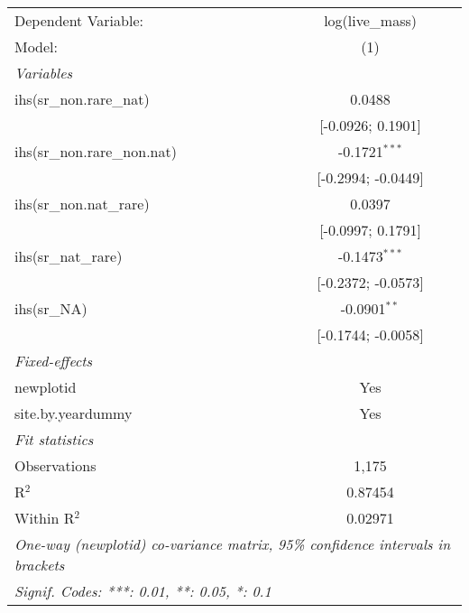 \begin{tabular}{lc}
\tabularnewline\midrule\midrule
Dependent Variable:&log(live\_mass)\\
Model:&(1)\\
\midrule \emph{Variables}&  \\
ihs(sr\_non.rare\_nat)&0.0488\\
  &[-0.0926; 0.1901]\\
ihs(sr\_non.rare\_non.nat)&-0.1721$^{***}$\\
  &[-0.2994; -0.0449]\\
ihs(sr\_non.nat\_rare)&0.0397\\
  &[-0.0997; 0.1791]\\
ihs(sr\_nat\_rare)&-0.1473$^{***}$\\
  &[-0.2372; -0.0573]\\
ihs(sr\_NA)&-0.0901$^{**}$\\
  &[-0.1744; -0.0058]\\
\midrule \emph{Fixed-effects}&  \\
newplotid & Yes\\
site.by.yeardummy & Yes\\
\midrule \emph{Fit statistics}&  \\
Observations & 1,175\\
R$^2$ & 0.87454\\
Within R$^2$ & 0.02971\\
\midrule\midrule\multicolumn{2}{l}{\emph{One-way (newplotid) co-variance matrix, 95\% confidence intervals in brackets}}\\
\multicolumn{2}{l}{\emph{Signif. Codes: ***: 0.01, **: 0.05, *: 0.1}}\\
\end{tabular}


